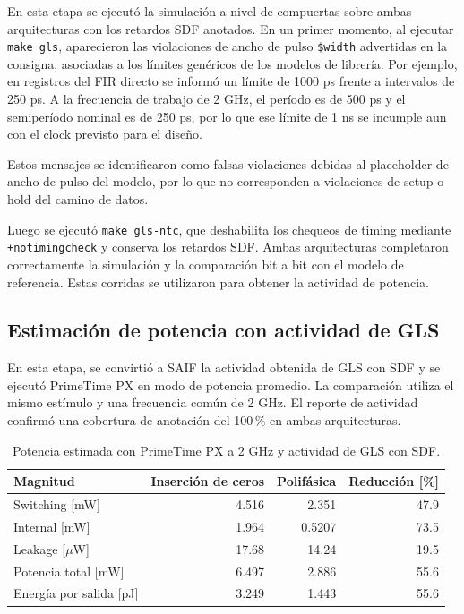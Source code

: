 \documentclass[10pt,a4paper]{article}
\begin{document}
En esta etapa se ejecutó la simulación a nivel de compuertas sobre ambas 
arquitecturas con los retardos SDF anotados. En un primer momento, al ejecutar
\texttt{make gls}, aparecieron las violaciones de ancho de pulso \texttt{\$width} 
advertidas en la consigna, asociadas a los límites genéricos de los modelos de 
librería.  Por ejemplo, en registros del FIR directo se informó un límite de 
1000 ps frente a intervalos de 250 ps. A la frecuencia de trabajo de 2 GHz, 
el período es de 500 ps y el semiperíodo nominal es de 250 ps, por lo que ese 
límite de 1 ns se incumple aun con el clock previsto para el diseño.

Estos mensajes se identificaron como falsas violaciones debidas al placeholder
de ancho de pulso del modelo, por lo que no corresponden a violaciones de setup o
hold del camino de datos.

Luego se ejecutó \texttt{make gls-ntc}, que deshabilita los chequeos de timing
mediante \texttt{+notimingcheck} y conserva los retardos SDF. Ambas arquitecturas
completaron correctamente la simulación y la comparación bit a bit con el modelo
de referencia. Estas corridas se utilizaron para obtener la actividad de potencia.

\subsection{Estimación de potencia con actividad de GLS}
\label{sec:potencia-inicial}

En esta etapa, se convirtió a SAIF la actividad obtenida de GLS con SDF y
se ejecutó PrimeTime PX en modo de potencia promedio. La comparación utiliza el
mismo estímulo y una frecuencia común de 2 GHz. El reporte de actividad confirmó
una cobertura de anotación del 100\,\% en ambas arquitecturas.

\begin{table}[H]
    \centering
    \caption{Potencia estimada con PrimeTime PX a 2 GHz y actividad de GLS con SDF.}
    \label{tab:potencia-inicial}
    \begin{tabular}{@{}lrrr@{}}
        \toprule
        \textbf{Magnitud} & \textbf{Inserción de ceros} & \textbf{Polifásica} &
        \textbf{Reducción [\%]} \\
        \midrule
        Switching [mW]          & 4.516  & 2.351  & 47.9 \\
        Internal [mW]           & 1.964  & 0.5207 & 73.5 \\
        Leakage [$\mu$W]        & 17.68  & 14.24  & 19.5 \\
        Potencia total [mW]     & 6.497  & 2.886  & 55.6 \\
        Energía por salida [pJ] & 3.249  & 1.443  & 55.6 \\
        \bottomrule
    \end{tabular}
\end{table}
\end{document}
